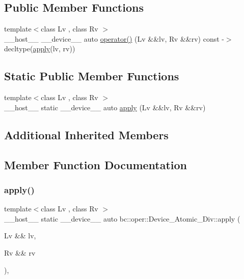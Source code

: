 \subsection*{Public Member Functions}
\begin{DoxyCompactItemize}
\item 
{\footnotesize template$<$class Lv , class Rv $>$ }\\\+\_\+\+\_\+host\+\_\+\+\_\+ \+\_\+\+\_\+device\+\_\+\+\_\+ auto \hyperlink{structbc_1_1oper_1_1Device__Atomic__Div_a66864c43f3c616c7e01de23316e91ced}{operator()} (Lv \&\&lv, Rv \&\&rv) const -\/$>$ decltype(\hyperlink{structbc_1_1oper_1_1Device__Atomic__Div_a0cc2573258790f557f37f80bd3a95133}{apply}(lv, rv))
\end{DoxyCompactItemize}
\subsection*{Static Public Member Functions}
\begin{DoxyCompactItemize}
\item 
{\footnotesize template$<$class Lv , class Rv $>$ }\\\+\_\+\+\_\+host\+\_\+\+\_\+ static \+\_\+\+\_\+device\+\_\+\+\_\+ auto \hyperlink{structbc_1_1oper_1_1Device__Atomic__Div_a0cc2573258790f557f37f80bd3a95133}{apply} (Lv \&\&lv, Rv \&\&rv)
\end{DoxyCompactItemize}
\subsection*{Additional Inherited Members}


\subsection{Member Function Documentation}
\mbox{\label{structbc_1_1oper_1_1Device__Atomic__Div_a0cc2573258790f557f37f80bd3a95133}} 
\subsubsection{\texorpdfstring{apply()}{apply()}}
{\footnotesize\ttfamily template$<$class Lv , class Rv $>$ \\
\+\_\+\+\_\+host\+\_\+\+\_\+ static \+\_\+\+\_\+device\+\_\+\+\_\+ auto bc\+::oper\+::\+Device\+\_\+\+Atomic\+\_\+\+Div\+::apply (\begin{DoxyParamCaption}\item[{Lv \&\&}]{lv,  }\item[{Rv \&\&}]{rv }\end{DoxyParamCaption})\hspace{0.3cm}{\ttfamily [inline]}, {\ttfamily [static]}}

